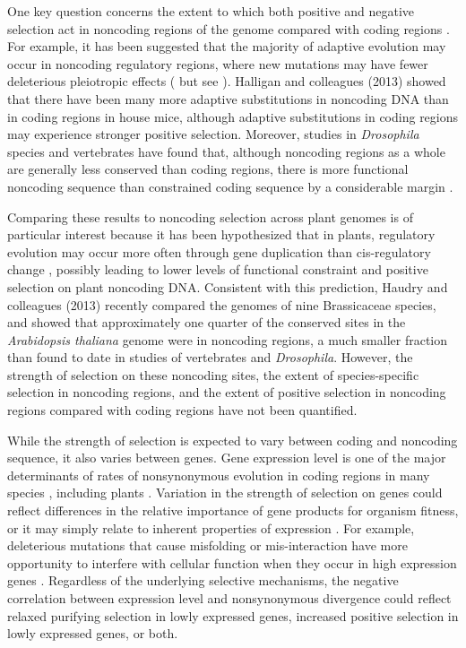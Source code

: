 One key question concerns the extent to which both positive and negative selection act in noncoding regions of the genome compared with coding regions \citep{andolfatto2005, hough2013, zhen2012, Halligan2013}. For example, it has been suggested that the majority of adaptive evolution may occur in noncoding regulatory regions, where new mutations may have fewer deleterious pleiotropic effects (\citealt{wray2007, carroll2005} but see \citealt{hoekstra2007}). Halligan and colleagues (2013) showed that there have been many more adaptive substitutions in noncoding DNA than in coding regions in house mice, although adaptive substitutions in coding regions may experience stronger positive selection. Moreover, studies in \textit{Drosophila} species and vertebrates have found that, although noncoding regions as a whole are generally less conserved than coding regions, there is more functional noncoding sequence than constrained coding sequence by a considerable margin \citep{andolfatto2005,keightley2003}. 

Comparing these results to noncoding selection across plant genomes is of particular interest because it has been hypothesized that in plants, regulatory evolution may occur more often through gene duplication than cis-regulatory change \citep{lockton2005}, possibly leading to lower levels of functional constraint and positive selection on plant noncoding DNA. Consistent with this prediction, Haudry and colleagues (2013) recently compared the genomes of nine Brassicaceae species, and showed that approximately one quarter of the conserved sites in the \textit{Arabidopsis thaliana} genome were in noncoding regions, a much smaller fraction than found to date in studies of vertebrates and \textit{Drosophila}. However, the strength of selection on these noncoding sites, the extent of species-specific selection in noncoding regions, and the extent of positive selection in noncoding regions compared with coding regions have not been quantified. 

While the strength of selection is expected to vary between coding and noncoding sequence, it also varies between genes. Gene expression level is one of the major determinants of rates of nonsynonymous evolution in coding regions in many species \citep{pal2001,subramanian2004,Drummond2006-pa}, including plants \citep{yang2011, slotte2011genomic, paape2013, renaut2012}. Variation in the strength of selection on genes could reflect differences in the relative importance of gene products for organism fitness, or it may simply relate to inherent properties of expression \citep{gaut2011}. For example, deleterious mutations that cause misfolding or mis-interaction have more opportunity to interfere with cellular function when they occur in high expression genes \citep{park2013,yang2012,drummond2008}. Regardless of the underlying selective mechanisms, the negative correlation between expression level and nonsynonymous divergence could reflect relaxed purifying selection in lowly expressed genes, increased positive selection in lowly expressed genes, or both.

